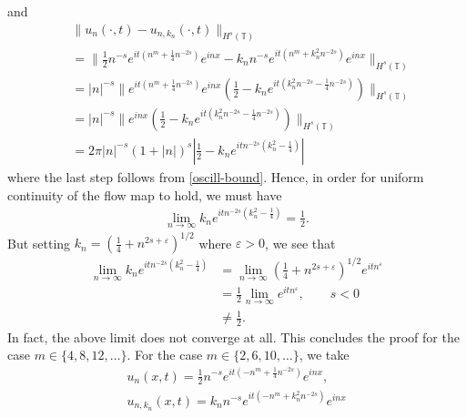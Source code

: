 \documentclass[12pt,reqno]{amsart}
\numberwithin{equation}{section}  %
\numberwithin{figure}{section}
\newcommand{\ci}{\mathbb{T}}
\newcommand{\ee}{\varepsilon}
\theoremstyle{plain}
\theoremstyle{definition}
\theoremstyle{remark}
\begin{document}
%
%
and
%
%
\begin{equation*}
	\begin{split}
		& \|u_{n}(\cdot, t) - u_{n, k_{n}}(\cdot, t) \|_{H^{s}(\ci)}
		\\
		& = \|\frac{1}{2}n^{-s}e^{it\left( n^{m} + \frac{1}{4}n^{-2s}
		\right)}e^{inx} - k_{n}n^{-s}e^{it\left( n^{m} + k_{n}^{2}n^{-2s}
		\right)}e^{inx} \|_{H^{s}(\ci)}
		\\
		& = | n |^{-s} \|e^{it\left( n^{m} + \frac{1}{4}n^{-2s}
		\right)}e^{inx}\left( \frac{1}{2} - k_{n}e^{it\left(
		k_{n}^{2}n^{-2s}-\frac{1}{4}n^{-2s} \right)} \right)\|_{H^{s}(\ci)}
		\\
		& = | n|^{-s} \|e^{inx}\left( \frac{1}{2} - k_{n}e^{it\left(
		k_{n}^{2}n^{-2s} - \frac{1}{4}n^{-2s}
		\right)} \right) \|_{H^{s}(\ci)}
		\\
    & = 2 \pi | n |^{-s} (1 + | n |)^{s} | \frac{1}{2} - k_{n}e^{itn^{-2s}\left( k_{n}^{2}- \frac{1}{4}\right)} |
	\end{split}
\end{equation*}
%
%
where the last step follows from \eqref{oscill-bound}. Hence, in order for uniform continuity of the flow map to hold, we must have
%
%
\begin{equation*}
	\begin{split}
		\lim_{n \to \infty}  k_{n} e^{itn^{-2s}\left( k_{n}^{2} -
		\frac{1}{4} \right)}  = \frac{1}{2}.
	\end{split}
\end{equation*}
%
%
But setting $k_{n} = \left( \frac{1}{4} + n^{2s + \ee} \right)^{1/2}$ where  $\ee >
0$, we see that 
%
%
\begin{equation*}
	\begin{split}
		\lim_{n \to \infty} k_{n} e^{itn^{-2s}\left( k_{n}^{2} - \frac{1}{4}
		\right)}
    & = \lim_{n \to \infty} \left( \frac{1}{4} + n^{2s + \ee} \right)^{1/2}
    e^{itn^{\ee}} \\ & = \frac{1}{2} \lim_{n \to \infty} e^{itn^{\ee}}, \qquad s
    < 0
    \\
    & \neq \frac{1}{2}.
	\end{split}
\end{equation*}
%
%
In fact, the above limit does not converge at all. This concludes the proof for
the case $m \in \{4, 8, 12, \dots \}$. For the case $m \in \{2, 6, 10, \dots \}$, we take
%
%
\begin{equation*}
	\begin{split}
		u_{n}(x,t) = \frac{1}{2}n^{-s}e^{it\left( -n^{m} + \frac{1}{4}n^{-2s}
		\right)}e^{inx},
		\\ u_{n, k_{n}}(x,t) = k_{n}n^{-s}e^{it\left( -n^{m} + k_{n}^{2}n^{-2s}
		\right)}e^{inx} 
	\end{split}
\end{equation*}
\end{document}
